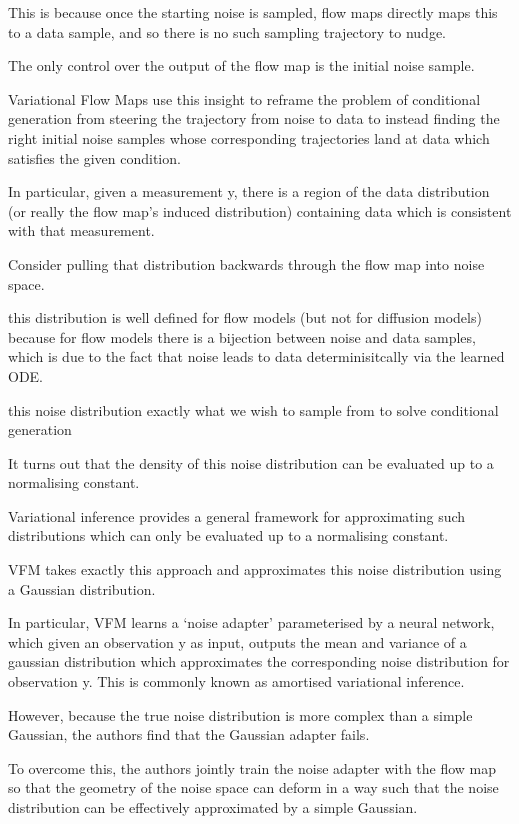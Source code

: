 \documentclass[12pt,a4paper]{report}
\begin{document}
This is because once the starting noise is sampled, flow maps directly maps this to a data sample, and so there is no such sampling trajectory to nudge. 

The only control over the output of the flow map is the initial noise sample. 

Variational Flow Maps use this insight to reframe the problem of conditional generation from steering the trajectory from noise to data to instead finding the right initial noise samples whose corresponding trajectories land at data which satisfies the given condition. 

In particular, given a measurement y, there is a region of the data distribution (or really the flow map’s induced distribution) containing data which is consistent with that measurement. 

Consider pulling that distribution backwards through the flow map into noise space. 

this distribution is well defined for flow models (but not for diffusion models) because for flow models there is a bijection between noise and data samples, which is due to the fact that noise leads to data determinisitcally via the learned ODE. 

this noise distribution exactly what we wish to sample from to solve conditional generation

It turns out that the density of this noise distribution can be evaluated up to a normalising constant. 

Variational inference provides a general framework for approximating such distributions which can only be evaluated up to a normalising constant. 

VFM takes exactly this approach and approximates this noise distribution using a Gaussian distribution. 

In particular, VFM learns a ‘noise adapter’ parameterised by a neural network, which given an observation y as input, outputs the mean and variance of a gaussian distribution which approximates the corresponding noise distribution for observation y. This is commonly known as amortised variational inference. 

However, because the true noise distribution is more complex than a simple Gaussian, the authors find that the Gaussian adapter fails. 

To overcome this, the authors jointly train the noise adapter with the flow map so that the geometry of the noise space can deform in a way such that the noise distribution can be effectively approximated by a simple Gaussian. 
\end{document}
